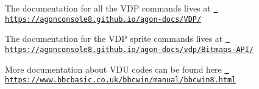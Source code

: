 
\begin{DoxyItemize}
\item The documentation for all the VDP commands lives at \href{https://agonconsole8.github.io/agon-docs/VDP/}{\texttt{ https\+://agonconsole8.\+github.\+io/agon-\/docs/\+VDP/}}
\item The documentation for the VDP sprite commands lives at \href{https://agonconsole8.github.io/agon-docs/vdp/Bitmaps-API/}{\texttt{ https\+://agonconsole8.\+github.\+io/agon-\/docs/vdp/\+Bitmaps-\/\+API/}}
\item More documentation about VDU codes can be found here \href{https://www.bbcbasic.co.uk/bbcwin/manual/bbcwin8.html}{\texttt{ https\+://www.\+bbcbasic.\+co.\+uk/bbcwin/manual/bbcwin8.\+html}} 
\end{DoxyItemize}